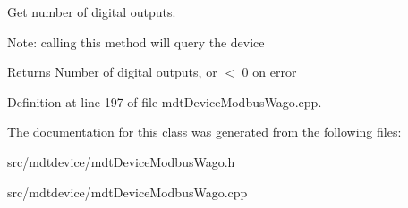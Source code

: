 Get number of digital outputs. 

Note: calling this method will query the device

\begin{DoxyReturn}{Returns}
Number of digital outputs, or $<$ 0 on error 
\end{DoxyReturn}


Definition at line 197 of file mdtDeviceModbusWago.cpp.



The documentation for this class was generated from the following files:\begin{DoxyCompactItemize}
\item 
src/mdtdevice/mdtDeviceModbusWago.h\item 
src/mdtdevice/mdtDeviceModbusWago.cpp\end{DoxyCompactItemize}
